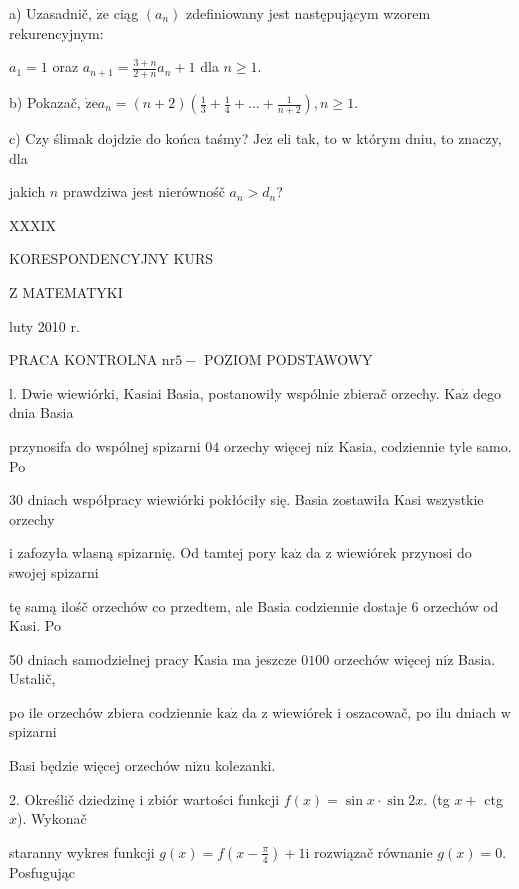 \documentclass[a4paper,12pt]{article}
\begin{document}
a) Uzasadnič, $\dot{\mathrm{z}}\mathrm{e}$ ciąg $(a_{n})$ zdefiniowany jest następującym wzorem rekurencyjnym:

$a_{1}=1$ oraz $a_{n+1}=\displaystyle \frac{3+n}{2+n}a_{n}+1$ dla $n\geq 1.$

b) Pokazač, $\displaystyle \dot{\mathrm{z}}\mathrm{e}a_{n}=(n+2)(\frac{1}{3}+\frac{1}{4}+\ldots+\frac{1}{n+2}), n\geq 1.$

c) Czy ślimak dojdzie do końca taśmy? $\mathrm{J}\mathrm{e}\dot{\mathrm{z}}$ eli tak, to $\mathrm{w}$ którym dniu, to znaczy, dla

jakich $n$ prawdziwa jest nierównośč $a_{n}>d_{n}$?





XXXIX

KORESPONDENCYJNY KURS

Z MATEMATYKI

luty 2010 r.

PRACA KONTROLNA $\mathrm{n}\mathrm{r} 5-$ POZIOM PODSTAWOWY

l. Dwie wiewiórki, Kasiai Basia, postanowiły wspólnie zbierač orzechy. $\mathrm{K}\mathrm{a}\dot{\mathrm{z}}$ dego dnia Basia

przynosifa do wspólnej spizarni $04$ orzechy więcej $\mathrm{n}\mathrm{i}\dot{\mathrm{z}}$ Kasia, codziennie tyle samo. Po

30 dniach współpracy wiewiórki pokłóciły się. Basia zostawiła Kasi wszystkie orzechy

$\mathrm{i}$ zafozyła wlasną spizarnię. Od tamtej pory $\mathrm{k}\mathrm{a}\dot{\mathrm{z}}$ da $\mathrm{z}$ wiewiórek przynosi do swojej spizarni

tę samą ilośč orzechów co przedtem, ale Basia codziennie dostaje 6 orzechów od Kasi. Po

50 dniach samodzielnej pracy Kasia ma jeszcze $0100$ orzechów więcej $\mathrm{n}\mathrm{i}\dot{\mathrm{z}}$ Basia. Ustalič,

po ile orzechów zbiera codziennie $\mathrm{k}\mathrm{a}\dot{\mathrm{z}}$ da $\mathrm{z}$ wiewiórek $\mathrm{i}$ oszacowač, po ilu dniach $\mathrm{w}$ spizarni

Basi będzie więcej orzechów $\mathrm{n}\mathrm{i}\dot{\mathrm{z}}\mathrm{u}$ kolezanki.

2. Określič dziedzinę $\mathrm{i}$ zbiór wartości funkcji $f(x)=\sin x\cdot\sin 2x$. (tg $x+$ ctg $x$). Wykonač

staranny wykres funkcji $g(x)=f(x-\displaystyle \frac{\pi}{4})+1\mathrm{i}$ rozwiązač równanie $g(x)=0$. Posfugując
\end{document}
